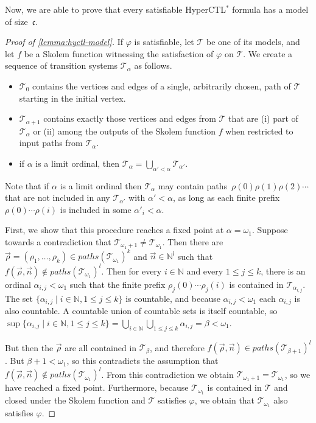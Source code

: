 \documentclass[dvipsnames,10pt,a4paper]{amsart}
\theoremstyle{definition}
\theoremstyle{remark}
\renewcommand{\phi}{\varphi}
\newcommand{\cont}{\mathfrak{c}}
\newcommand{\tsys}{\mathcal{T}}
\newcommand{\hyctlstar}{{HyperCTL$^*$}\xspace}
\renewcommand{\phi}{\varphi}
\begin{document}
Now, we are able to prove that every satisfiable \hyctlstar formula has a  model of size~$\cont$.

\begin{proof}[Proof of \autoref{lemma:hyctl-model}]
If $\phi$ is satisfiable, let $\tsys$ be one of its models, and let $f$ be a Skolem function witnessing the satisfaction of $\phi$ on $\tsys$. We create a sequence of transition systems $\tsys_\alpha$ as follows.
\begin{itemize}
	\item $\tsys_0$ contains the vertices and edges of a single, arbitrarily chosen, path of $\tsys$ starting in the initial vertex.
	\item $\tsys_{\alpha+1}$ contains exactly those vertices and edges from $\tsys$ that are (i) part of $\tsys_{\alpha}$ or (ii) among the outputs of the Skolem function $f$ when restricted to input paths from $\tsys_\alpha$.
	\item if $\alpha$ is a limit ordinal, then $\tsys_\alpha= \bigcup_{\alpha'<\alpha} \tsys_{\alpha'}$.
\end{itemize}
Note that if $\alpha$ is a limit ordinal then $\tsys_\alpha$ may contain paths~$\rho(0)\rho(1)\rho(2)\cdots$ that are not included in any $\tsys_{\alpha'}$ with $\alpha' <\alpha$, as long as each finite prefix $\rho(0) \cdots \rho(i)$ is included in some $\alpha'_i<\alpha$.

First, we show that this procedure reaches a fixed point at $\alpha = \omega_1$. Suppose towards a contradiction that $\tsys_{\omega_1+1}\not =\tsys_{\omega_1}$. Then there are $\vec{\rho}=(\rho_1,\ldots,\rho_k)\in \mathit{paths}(\tsys_{\omega_1})^k$ and $\vec{n}\in \mathbb{N}^l$ such that $f(\vec{\rho},\vec{n})\not \in \mathit{paths}(\tsys_{\omega_1})^l$. Then for every $i\in\mathbb{N}$ and every $1\leq j \leq k$, there is an ordinal $\alpha_{i,j}<\omega_1$ such that the finite prefix $\rho_j(0)\cdots \rho_j(i)$ is contained in $\tsys_{\alpha_{i,j}}$. The set $\{\alpha_{i,j}\mid i\in \mathbb{N}, 1\leq j \leq k\}$ is countable, and because $\alpha_{i,j}<\omega_1$ each $\alpha_{i,j}$ is also countable. A countable union of countable sets is itself countable, so $\sup \{\alpha_{i,j}\mid i\in \mathbb{N}, 1 \leq j \leq k\}=\bigcup_{i\in\mathbb{N}}\bigcup_{1\leq j \leq k}\alpha_{i,j}=\beta< \omega_1$. 

But then the $\vec{\rho}$ are all contained in $\tsys_\beta$, and therefore $f(\vec{\rho},\vec{n})\in \mathit{paths}(\tsys_{\beta+1})^l$. But $\beta+1< \omega_1$, so this contradicts the assumption that $f(\vec{\rho},\vec{n})\not \in \mathit{paths}(\tsys_{\omega_1})^l$. From this contradiction we obtain $\tsys_{\omega_1+1}=\tsys_{\omega_1}$, so we have reached a fixed point. Furthermore, because $\tsys_{\omega_1}$ is contained in $\tsys$ and closed under the Skolem function and $\tsys$ satisfies $\phi$, we obtain that $\tsys_{\omega_1}$ also satisfies $\phi$.


\end{proof}
\end{document}
